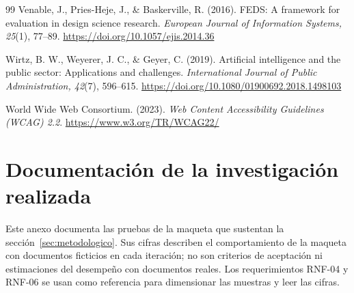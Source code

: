 \documentclass[11pt,a4paper]{article}
\begin{document}
\begin{thebibliography}{99}
Venable, J., Pries-Heje, J., \& Baskerville, R. (2016). FEDS: A framework for evaluation in design science research. \emph{European Journal of Information Systems, 25}(1), 77--89. \url{https://doi.org/10.1057/ejis.2014.36}

Wirtz, B. W., Weyerer, J. C., \& Geyer, C. (2019). Artificial intelligence and the public sector: Applications and challenges. \emph{International Journal of Public Administration, 42}(7), 596--615. \url{https://doi.org/10.1080/01900692.2018.1498103}

World Wide Web Consortium. (2023). \emph{Web Content Accessibility Guidelines (WCAG) 2.2}. \url{https://www.w3.org/TR/WCAG22/}

\end{thebibliography}


\clearpage
\appendix
\section{Documentación de la investigación realizada}
\label{sec:anexo}
\label{sec:evaluacion}
Este anexo documenta las pruebas de la maqueta que sustentan la sección~\ref{sec:metodologico}. Sus cifras describen el comportamiento de la maqueta con documentos ficticios en cada iteración; no son criterios de aceptación ni estimaciones del desempeño con documentos reales. Los requerimientos RNF-04 y RNF-06 se usan como referencia para dimensionar las muestras y leer las cifras.
\end{document}
